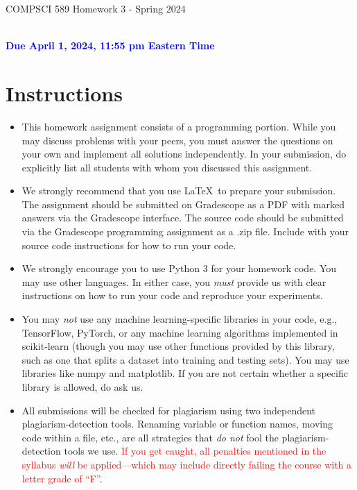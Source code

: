 \documentclass[letterpaper]{article}
\newcommand{\HIGHLIGHT}[1]{\textcolor{blue}{\textbf{#1}}}
\begin{document}
\newpage
\begin{center}
    \begin{Large}
    COMPSCI 589 Homework 3 - Spring 2024
    \end{Large}
    \\
    \HIGHLIGHT{Due April 1, 2024, 11:55 pm Eastern Time}
\end{center}



\vspace{0.25in}
\section{Instructions}

\begin{itemize}
    \item This homework assignment consists of a programming portion. While you may discuss problems with your peers, you must answer the questions on your own and implement all solutions independently. In your submission, do explicitly list all students with whom you discussed this assignment. 
    \item We strongly recommend that you use \LaTeX~to prepare your submission. The assignment should be submitted on Gradescope as a PDF with marked answers via the Gradescope interface. The source code should be submitted via the Gradescope programming assignment as a .zip file. Include with your source code instructions for how to run your code. 
    \item We strongly encourage you to use Python 3 for your homework code. You may use other languages. In either case, you \textit{must} provide us with clear instructions on how to run your code and reproduce your experiments. 
    \item You may \textit{not} use any machine learning-specific libraries in your code, e.g., TensorFlow, PyTorch, or any machine learning algorithms implemented in scikit-learn (though you may use other functions provided by this library, such as one that splits a dataset into training and testing sets). You may use libraries like numpy and matplotlib. If you are not certain whether a specific library is allowed, do ask us.
    \item All submissions will be checked for plagiarism using two independent plagiarism-detection tools. Renaming variable or function names, moving code within a file, etc., are all strategies that \textit{do not} fool the plagiarism-detection tools we use. \textcolor{red}{If you get caught, all penalties mentioned in the syllabus \textit{will} be applied---which may include directly failing the course with a letter grade of ``F''}.


\end{itemize}
\end{document}
